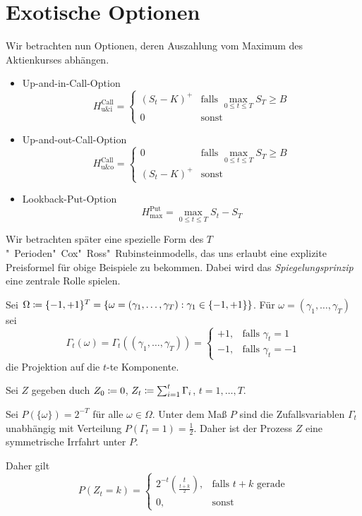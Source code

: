 \documentclass[a4paper,twoside,DIV15,BCOR12mm]{scrbook}
\begin{document}
\section{Exotische Optionen}
Wir betrachten nun Optionen, deren Auszahlung vom Maximum des Aktienkurses abhängen.

\begin{beispiel}
\begin{itemize}
\item Up-and-in-Call-Option
\[
H_{\text{u\&i}}^{\text{Call}} = 
\begin{cases}
(S_t-K)^+ & \text{falls }\max_{0\le t\le T}S_T \ge B \\
0 & \text{sonst}
\end{cases}
\]
\item Up-and-out-Call-Option
\[
H_{\text{u\&o}}^{\text{Call}} = 
\begin{cases}
0 & \text{falls }\max_{0\le t\le T}S_T \ge B \\
(S_t-K)^+ & \text{sonst}
\end{cases}
\]
\item Lookback-Put-Option
\[
H_{\text{max}}^{\text{Put}} =  \max_{0\le t\le T} S_t - S_T
\]
\end{itemize}
\end{beispiel}

Wir betrachten später eine spezielle Form des $T$"~Perioden"~Cox"~Ross"~Rubinsteinmodells, das uns erlaubt eine explizite Preisformel für obige Beispiele zu bekommen. Dabei wird das \emph{Spiegelungsprinzip} eine zentrale Rolle spielen.

Sei $\Omega \da \{-1,+1\}^T = \{\omega = (\gamma_1,\ldots,\gamma_T): \gamma_1\in\{-1,+1\}\}$. Für $\omega=(\gamma_1,\ldots,\gamma_T)$ sei 
\[
\Gamma_t(\omega) =\Gamma_t( (\gamma_1,\ldots,\gamma_T) ) = 
\begin{cases}
+1, &\text{falls }\gamma_t = 1\\
-1, &\text{falls }\gamma_t = -1
\end{cases}
\]
die Projektion auf die $t$-te Komponente.

Sei $Z$ gegeben duch $Z_0 \da 0$, $Z_t \da \sum_{i=1}^t \Gamma_i$, $t=1,\ldots,T$.

Sei $P(\{\omega\}) = 2^{-T}$ für alle $\omega\in \Omega$.
Unter dem Maß $P$ sind die Zufallsvariablen $\Gamma_t$ unabhängig mit Verteilung $P(\Gamma_t = 1)=\frac12$. Daher ist der Prozess $Z$ eine symmetrische Irrfahrt unter $P$.

Daher gilt 
\[
P(Z_t=k) =
\begin{cases}
2^{-t} \binom{t}{\frac{t+k}2},& \text{falls $t+k$ gerade} \\
0 ,&\text{sonst}
\end{cases}
\]
\end{document}
